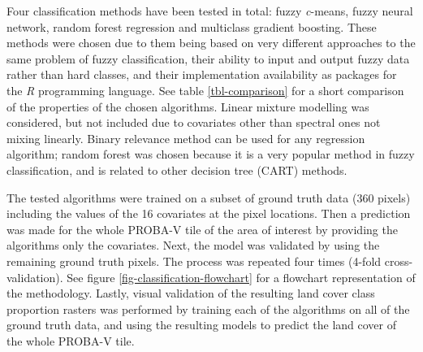 \documentclass[a4paper,12pt]{scrbook}
\begin{document}
Four classification methods have been tested in total: fuzzy \textit{c}-means, fuzzy neural network, random forest regression and multiclass gradient boosting. These methods were chosen due to them being based on very different approaches to the same problem of fuzzy classification, their ability to input and output fuzzy data rather than hard classes, and their implementation availability as packages for the \textit{R} programming language. See table \ref{tbl-comparison} for a short comparison of the properties of the chosen algorithms. Linear mixture modelling was considered, but not included due to covariates other than spectral ones not mixing linearly. Binary relevance method can be used for any regression algorithm; random forest was chosen because it is a very popular method in fuzzy classification, and is related to other decision tree (CART) methods.

\begin{table}
  \begin{center}
  \end{center}
  \caption{Feature comparison between the chosen fuzzy classification methods in this study.}
  \label{tbl-comparison}
\end{table}

The tested algorithms were trained on a subset of ground truth data (360 pixels) including the values of the 16 covariates at the pixel locations. Then a prediction was made for the whole PROBA-V tile of the area of interest by providing the algorithms only the covariates. Next, the model was validated by using the remaining ground truth pixels. The process was repeated four times (4-fold cross-validation). See figure \ref{fig-classification-flowchart} for a flowchart representation of the methodology. Lastly, visual validation of the resulting land cover class proportion rasters was performed by training each of the algorithms on all of the ground truth data, and using the resulting models to predict the land cover of the whole PROBA-V tile.
\end{document}
